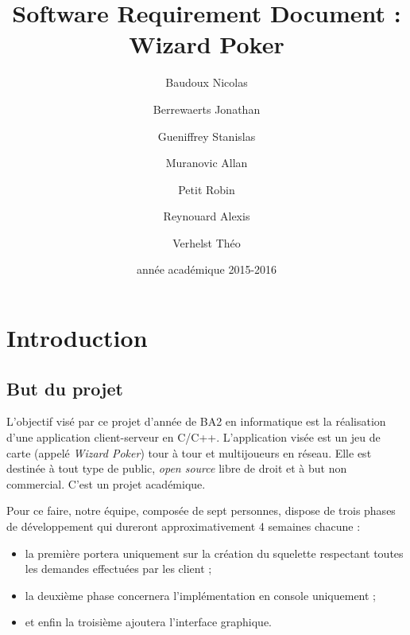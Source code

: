 \documentclass{article}
\title{Software Requirement Document : Wizard Poker}
\author{Baudoux Nicolas \and Berrewaerts Jonathan \and Gueniffrey Stanislas \and Muranovic Allan \and Petit Robin \and Reynouard Alexis \and Verhelst Théo}
\date{année académique 2015-2016}
\begin{document}
\maketitle
\tableofcontents
\newpage
{}

\section{Introduction}
    \subsection{But du projet}
        L'objectif visé par ce projet d'année de BA2 en informatique est la réalisation d'une application client-serveur en C/C++. L'application visée est
        un jeu de carte (appelé \textit{Wizard Poker}) tour à tour et multijoueurs en réseau. Elle est destinée à tout type de public, \textit{open source}
        libre de droit et à but non commercial. C'est un projet académique.  %

        Pour ce faire, notre équipe, composée de sept personnes, dispose de trois phases de développement qui dureront approximativement 4 semaines chacune :
        \begin{itemize}
            \item la première portera uniquement sur la création du squelette respectant toutes les demandes effectuées par les client ;
            \item la deuxième phase concernera l'implémentation en console uniquement ;
            \item et enfin la troisième ajoutera l'interface graphique.
        \end{itemize}
\end{document}
